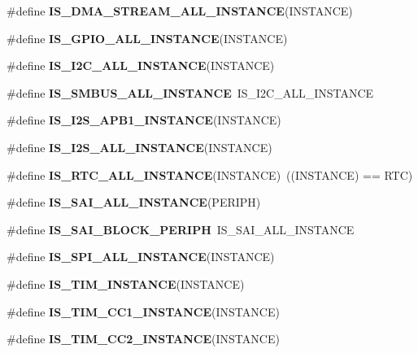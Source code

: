 \begin{DoxyCompactItemize}
\item 
\#define {\bfseries I\+S\+\_\+\+D\+M\+A\+\_\+\+S\+T\+R\+E\+A\+M\+\_\+\+A\+L\+L\+\_\+\+I\+N\+S\+T\+A\+N\+CE}(I\+N\+S\+T\+A\+N\+CE)
\item 
\#define {\bfseries I\+S\+\_\+\+G\+P\+I\+O\+\_\+\+A\+L\+L\+\_\+\+I\+N\+S\+T\+A\+N\+CE}(I\+N\+S\+T\+A\+N\+CE)
\item 
\#define {\bfseries I\+S\+\_\+\+I2\+C\+\_\+\+A\+L\+L\+\_\+\+I\+N\+S\+T\+A\+N\+CE}(I\+N\+S\+T\+A\+N\+CE)
\item 
\mbox{\label{group___exported__macros_ga85b79d63f4643c0de9a7519290a0eceb}} 
\#define {\bfseries I\+S\+\_\+\+S\+M\+B\+U\+S\+\_\+\+A\+L\+L\+\_\+\+I\+N\+S\+T\+A\+N\+CE}~I\+S\+\_\+\+I2\+C\+\_\+\+A\+L\+L\+\_\+\+I\+N\+S\+T\+A\+N\+CE
\item 
\#define {\bfseries I\+S\+\_\+\+I2\+S\+\_\+\+A\+P\+B1\+\_\+\+I\+N\+S\+T\+A\+N\+CE}(I\+N\+S\+T\+A\+N\+CE)
\item 
\#define {\bfseries I\+S\+\_\+\+I2\+S\+\_\+\+A\+L\+L\+\_\+\+I\+N\+S\+T\+A\+N\+CE}(I\+N\+S\+T\+A\+N\+CE)
\item 
\mbox{\label{group___exported__macros_gab4230e8bd4d88adc4250f041d67375ce}} 
\#define {\bfseries I\+S\+\_\+\+R\+T\+C\+\_\+\+A\+L\+L\+\_\+\+I\+N\+S\+T\+A\+N\+CE}(I\+N\+S\+T\+A\+N\+CE)~((I\+N\+S\+T\+A\+N\+CE) == R\+TC)
\item 
\#define {\bfseries I\+S\+\_\+\+S\+A\+I\+\_\+\+A\+L\+L\+\_\+\+I\+N\+S\+T\+A\+N\+CE}(P\+E\+R\+I\+PH)
\item 
\mbox{\label{group___exported__macros_gae9459b2e443c3f8139809cca5e15ad09}} 
\#define {\bfseries I\+S\+\_\+\+S\+A\+I\+\_\+\+B\+L\+O\+C\+K\+\_\+\+P\+E\+R\+I\+PH}~I\+S\+\_\+\+S\+A\+I\+\_\+\+A\+L\+L\+\_\+\+I\+N\+S\+T\+A\+N\+CE
\item 
\#define {\bfseries I\+S\+\_\+\+S\+P\+I\+\_\+\+A\+L\+L\+\_\+\+I\+N\+S\+T\+A\+N\+CE}(I\+N\+S\+T\+A\+N\+CE)
\item 
\#define {\bfseries I\+S\+\_\+\+T\+I\+M\+\_\+\+I\+N\+S\+T\+A\+N\+CE}(I\+N\+S\+T\+A\+N\+CE)
\item 
\#define {\bfseries I\+S\+\_\+\+T\+I\+M\+\_\+\+C\+C1\+\_\+\+I\+N\+S\+T\+A\+N\+CE}(I\+N\+S\+T\+A\+N\+CE)
\item 
\#define {\bfseries I\+S\+\_\+\+T\+I\+M\+\_\+\+C\+C2\+\_\+\+I\+N\+S\+T\+A\+N\+CE}(I\+N\+S\+T\+A\+N\+CE)
\item 

\end{DoxyCompactItemize}
